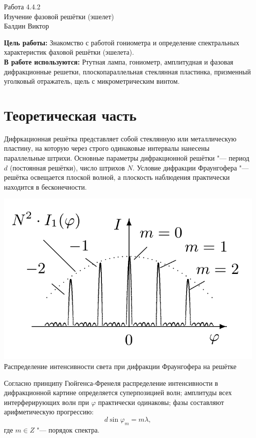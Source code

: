 \documentclass[a4paper,12pt]{article}
\begin{document}
\begin{center}
  \LARGE{Работа 4.4.2}\\[0.2cm]
  \LARGE{Изучение фазовой решётки (эшелет)}\\[0.2cm]
  \large{Балдин Виктор}\\[0.2cm]
\end{center}

\textbf{Цель работы:} Знакомство с работой гониометра и определение спектральных характеристик фаховой решётки (эшелета).\\
\textbf{В работе используются:} Ртутная лампа, гониометр, амплитудная и фазовая дифракционные решетки, плоскопараллельная стеклянная пластинка, призменный уголковый отражатель, щель с микрометрическим винтом.\
\section*{Теоретическая часть}
Дифркационная решётка представляет собой стеклянную или металлическую пластину, на которую через строго одинаковые интервалы нанесены параллельные штрихи. Основные параметры дифракционной решётки "--- период $d$ (постоянная решётки), число штрихов $N$.
Условие дифракции Фраунгофера "--- решётка освещается плоской волной, а плоскость наблюдения практически находится в бесконечности.

\begin{center}
    \includegraphics[width = 1.0\linewidth]{1.png}
    {Распределение интенсивности света при дифракции Фраунгофера на решётке}
\end{center}

Согласно принципу Гюйгенса-Френеля распределение интенсивности в дифракционной картине определяется суперпозицией волн; амплитуды всех интерферирующих волн при $\varphi$ практически одинаковы; фазы составляют арифметическую прогрессию:
\[
    d \sin \varphi_m = m \lambda,
 \]
 где $m \in Z$ "--- порядок спектра.
\end{document}
